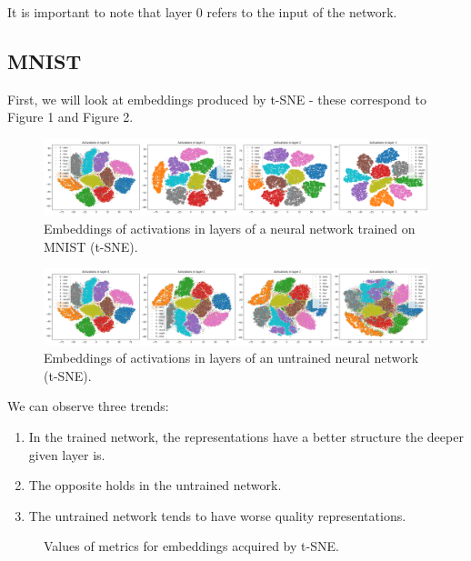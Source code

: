 \documentclass{article}
\begin{document}
It is important to note that layer 0 refers to the input of the network.

\subsection{MNIST}
First, we will look at embeddings produced by t-SNE - these correspond
to Figure 1 and Figure 2. 

\begin{figure}
  \centering
    \includegraphics[width=1.0\textwidth]{../../out/activations_feedforward/mnist_t-sne_trained.png}
    \caption{Embeddings of activations in layers of a neural network trained on MNIST (t-SNE).}
\end{figure}

\begin{figure}
  \centering
    \includegraphics[width=1.0\textwidth]{../../out/activations_feedforward/mnist_t-sne_untrained.png}
  \caption{Embeddings of activations in layers of an untrained neural network (t-SNE).}
\end{figure}

We can observe three trends:
\begin{enumerate}
  \item In the trained network, the representations have a better structure the
      deeper given layer is.
  \item The opposite holds in the untrained network.
  \item The untrained network tends to have worse quality representations.
\end{enumerate}

\begin{figure}
  \centering
    \resizebox{\textwidth}{!}{
        
    }
  \caption{Values of metrics for embeddings acquired by t-SNE.}
\end{figure}
\end{document}
